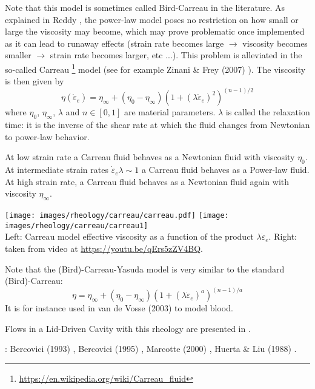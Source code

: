 

Note that this model is sometimes called Bird-Carreau in the literature. 
As explained in Reddy \cite{reddybook2}, the power-law model poses no restriction on 
how small or large the viscosity may become, which may prove problematic once 
implemented as it can lead to runaway effects (strain rate becomes large $\rightarrow$
viscosity becomes smaller $\rightarrow$ strain rate becomes larger, etc ...).
This problem is alleviated in the so-called Carreau
\footnote{\url{https://en.wikipedia.org/wiki/Carreau_fluid}} model \cite{carr72} 
(see for example Zinani \& Frey (2007) \cite{zifr07}). 
The viscosity is then given by
\begin{equation}
\eta(\dot{\varepsilon}_{e}) = \eta_\infty + (\eta_0-\eta_\infty) \left(1 + (\lambda \dot{\varepsilon}_{e})^2 \right)^{(n-1)/2}
\end{equation}
where $\eta_0$, $\eta_\infty$, $\lambda$ and $n\in[0,1]$ are material parameters. 
$\lambda$ is called the relaxation time: it is the inverse of the shear rate at which 
the fluid changes from Newtonian to power-law behavior.

At low strain rate a Carreau fluid behaves as a Newtonian fluid with viscosity $\eta_0$.
At intermediate strain rates $\dot{\varepsilon}_{e} \lambda \sim 1$ a Carreau fluid behaves 
as a Power-law fluid. At high strain rate, a Carreau fluid behaves as a Newtonian fluid 
again with viscosity $\eta_\infty$.
 
\begin{center}
\texttt{[image: images/rheology/carreau/carreau.pdf]}
\texttt{[image: images/rheology/carreau/carreau1]}\\
{\captionfont Left: Carreau model effective viscosity as a function of 
the product $\lambda \dot{\varepsilon}_{e}$. Right: taken from 
video at \url{https://youtu.be/qErs5zZV4BQ}.}
\end{center}

Note that the (Bird)-Carreau-Yasuda model \cite{yaac81,osru14} is very similar to the standard (Bird)-Carreau:
\begin{equation}
\eta = \eta_\infty + (\eta_0-\eta_\infty) \left(1 + (\lambda \dot{\varepsilon}_{e})^a \right)^{(n-1)/a}
\end{equation}
It is for instance used in van de Vosse \etal (2003) \cite{vadv03} to model blood.

Flows in a Lid-Driven Cavity with this rheology are presented in \cite{zifr07,shal09}.

\Literature: Bercovici (1993) \cite{berc93}, Bercovici (1995) \cite{berc95},
Marcotte (2000) \cite{marc00}, Huerta \& Liu (1988) \cite{huli88}.
